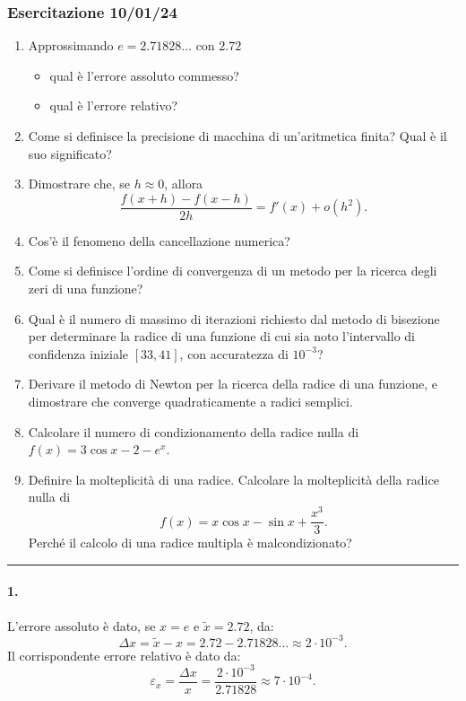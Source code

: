 \subsubsection{Esercitazione 10/01/24}
\begin{enumerate}
	\item Approssimando $e=2.71828\hdots$ con $2.72$
	\begin{itemize}
		\item qual è l'errore assoluto commesso?
		\item qual è l'errore relativo?
	\end{itemize}
	\item Come si definisce la precisione di macchina di un'aritmetica finita? Qual è il suo significato?
	\item Dimostrare che, se $h\approx 0$, allora
	\begin{equation*}
		\frac{f(x+h)-f(x-h)}{2h}=f'(x)+o(h^2).
	\end{equation*}
	\item Cos'è il fenomeno della cancellazione numerica?
	\item Come si definisce l'ordine di convergenza di un metodo per la ricerca degli zeri di una funzione?
	\item Qual è il numero di massimo di iterazioni richiesto dal metodo di bisezione per determinare la radice di una funzione di cui sia noto l'intervallo di confidenza iniziale $[33,41]$, con accuratezza di $10^{-3}$?
	\item Derivare il metodo di Newton per la ricerca della radice di una funzione, e dimostrare che converge quadraticamente a radici semplici.
	\item Calcolare il numero di condizionamento della radice nulla di $f(x)=3\cos x-2-e^x$.
	\item Definire la molteplicità di una radice. Calcolare la molteplicità della radice nulla di
	\begin{equation*}
		f(x)=x\cos x - \sin x + \frac{x^3}{3}.
	\end{equation*}
	Perché il calcolo di una radice multipla è malcondizionato?
\end{enumerate}

\hrule

\paragraph{1.} L'errore assoluto è dato, se $x=e$ e $\tilde x=2.72$, da:
\begin{equation*}
	\Delta x=\tilde x - x = 2.72 - 2.71828\hdots \approx 2\cdot 10^{-3}.
\end{equation*}
Il corrispondente errore relativo è dato da:
\begin{equation*}
	\varepsilon_x = \frac{\Delta x}{x} = \frac{2    \cdot10^{-3}}{2.71828}\approx 7\cdot 10^{-4}.
\end{equation*}

